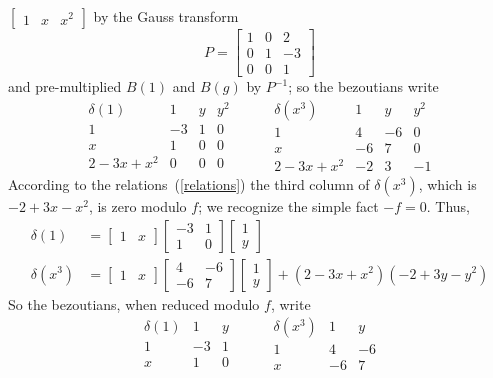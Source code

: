 \documentclass{standalone}
\begin{document}
$\begin{bmatrix}
	1 & x & x^2
\end{bmatrix}$ by the Gauss transform
$$P =
\begin{bmatrix}
	1 & 0 & 2 \\
	0 & 1 & -3 \\
	0 & 0 & 1
\end{bmatrix}$$
and pre-multiplied $B(1)$ and $B(g)$ by $P^{-1}$; so the bezoutians write
$$
\begin{array}{c|ccc}
	\delta(1) & 1 & y & y^2\\
	\hline
	1 & -3 & 1 & 0\\
	x & 1 & 0 & 0\\
	2 - 3x + x^2 & 0 & 0 & 0
\end{array}
\hspace{1cm}
\begin{array}{c|ccc}
	\delta(x^3) & 1 & y & y^2\\
	\hline
	1 & 4 & -6 & 0 \\
	x & -6 & 7 & 0 \\
	2 - 3x + x^2 & -2 & 3 & -1
\end{array}
$$
According to the relations~(\ref{relations}) the third column of $\delta(x^3)$, which is $-2 + 3x - x^2$, is zero modulo $f$; we recognize the simple fact $-f = 0$. Thus,
\begin{align} \nonumber %
\delta(1) &= \begin{bmatrix}
	1 & x
\end{bmatrix}
\begin{bmatrix}
	-3 & 1 \\
	1 & 0
\end{bmatrix} \nonumber %
\begin{bmatrix}
	1 \\
	y
\end{bmatrix}\\
\delta(x^3) &= \begin{bmatrix}
	1 & x
\end{bmatrix}
\begin{bmatrix}
	4 & -6 \\
	-6 & 7
\end{bmatrix} \nonumber %
\begin{bmatrix}
	1 \\
	y
\end{bmatrix} + (2 - 3x + x^2)(-2 + 3y - y^2)
\end{align}
So the bezoutians, when reduced modulo $f$, write
$$
\begin{array}{c|cc}
	\delta(1) & 1 & y \\
	\hline
	1 & -3 & 1 \\
	x & 1 & 0
\end{array}
\hspace{1cm}
\begin{array}{c|cc}
	\delta(x^3) & 1 & y \\
	\hline
	1 & 4 & -6  \\
	x & -6 & 7
\end{array}
$$
\end{document}
